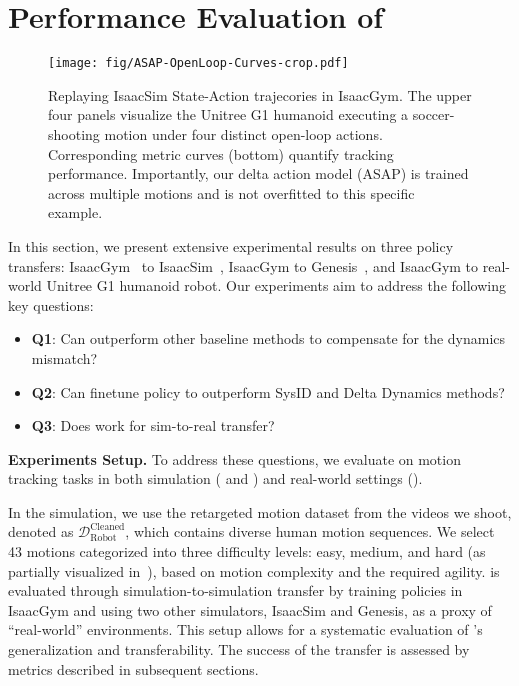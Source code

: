
\section{Performance Evaluation of \method}
\label{sec:EXP1}

\begin{figure*}[t]
    \centering
    \texttt{[image: fig/ASAP-OpenLoop-Curves-crop.pdf]}
    \vspace{-6mm}
    \caption{Replaying IsaacSim State-Action trajecories in IsaacGym. The upper four panels visualize the Unitree G1 humanoid executing a soccer-shooting motion under four distinct open-loop actions. Corresponding metric curves (bottom) quantify tracking performance. Importantly, our delta action model (ASAP) is trained across multiple motions and is not overfitted to this specific example.}
    \label{fig:ASAP_openloop_curves}
    \vspace{-3mm}
\end{figure*}

In this section, we present extensive experimental results on three policy transfers: IsaacGym~\cite{makoviychuk2021isaac} to IsaacSim~\cite{mittal2023orbit}, IsaacGym to Genesis~\cite{Genesis}, and IsaacGym to real-world Unitree G1 humanoid robot. Our experiments aim to address the following key questions:
\begin{itemize}
    \item \textbf{Q1}: Can \method outperform other baseline methods to compensate for the dynamics mismatch? 
    \item \textbf{Q2}: Can \method finetune policy to outperform SysID and Delta Dynamics methods? 
    \item \textbf{Q3}: Does \method work for sim-to-real transfer?
\end{itemize}

\textbf{Experiments Setup.}
To address these questions, we evaluate \method on motion tracking tasks in both simulation ( and ) and real-world settings ().

In the simulation, we use the retargeted motion dataset from the videos we shoot, denoted as ${\mathcal{D}}_{\text{Robot}}^{\text{Cleaned}}$, which contains diverse human motion sequences. We select 43 motions categorized into three difficulty levels: easy, medium, and hard (as partially visualized in~), based on motion complexity and the required agility. \method is evaluated through simulation-to-simulation transfer by training policies in IsaacGym and using two other simulators, IsaacSim and Genesis, as a proxy of ``real-world'' environments. This setup allows for a systematic evaluation of \method's generalization and transferability. The success of the transfer is assessed by metrics described in subsequent sections.

